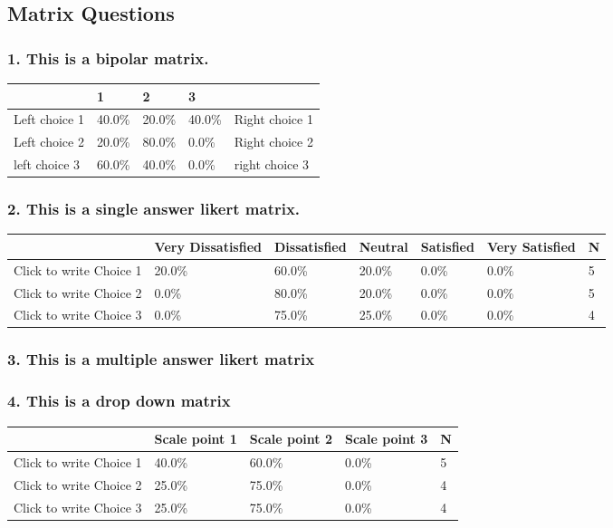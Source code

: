 \documentclass{article}\usepackage[]{graphicx}\usepackage[]{color}
\begin{document}
\subsection*{Matrix Questions}
\subsubsection*{1.
This is a bipolar matrix.}

\begin{tabular}{l|l|l|l|l}
\hline
 & 1 & 2 & 3 & \\
\hline
Left choice 1 & 40.0\% & 20.0\% & 40.0\% & Right choice 1\\
\hline
Left choice 2 & 20.0\% & 80.0\% & 0.0\% & Right choice 2\\
\hline
left choice 3 & 60.0\% & 40.0\% & 0.0\% & right choice 3\\
\hline
\end{tabular}


\hfill \break \hfill \break
\subsubsection*{2.
This is a single answer likert matrix.}

\begin{tabular}{l|l|l|l|l|l|l}
\hline
 & Very Dissatisfied & Dissatisfied  & Neutral & Satisfied & Very Satisfied & N\\
\hline
Click to write Choice 1 & 20.0\% & 60.0\% & 20.0\% & 0.0\% & 0.0\% & 5\\
\hline
Click to write Choice 2 & 0.0\% & 80.0\% & 20.0\% & 0.0\% & 0.0\% & 5\\
\hline
Click to write Choice 3 & 0.0\% & 75.0\% & 25.0\% & 0.0\% & 0.0\% & 4\\
\hline
\end{tabular}


\hfill \break \hfill \break
\subsubsection*{3.
This is a multiple answer likert matrix}

\hfill \break \hfill \break
\subsubsection*{4.
This is a drop down matrix}

\begin{tabular}{l|l|l|l|l}
\hline
 & Scale point 1 & Scale point 2 & Scale point 3 & N\\
\hline
Click to write Choice 1 & 40.0\% & 60.0\% & 0.0\% & 5\\
\hline
Click to write Choice 2 & 25.0\% & 75.0\% & 0.0\% & 4\\
\hline
Click to write Choice 3 & 25.0\% & 75.0\% & 0.0\% & 4\\
\hline
\end{tabular}
\end{document}
